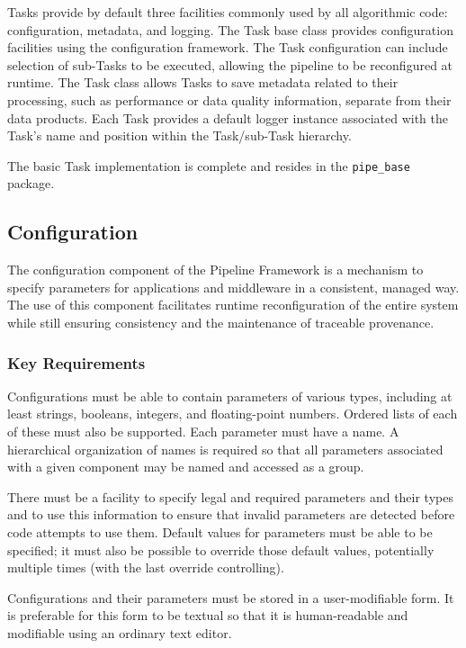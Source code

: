 \documentclass[DM,toc]{lsstdoc}
\begin{document}
Tasks provide by default three facilities commonly used by all algorithmic
code: configuration, metadata, and logging.  The Task base class provides
configuration facilities using the configuration framework. The Task
configuration can include selection of sub-Tasks to be executed, allowing the
pipeline to be reconfigured at runtime.  The Task class allows Tasks to save
metadata related to their processing, such as performance or data quality
information, separate from their data products.  Each Task provides a default
logger instance associated with the Task's name and position within the
Task/sub-Task hierarchy.

The basic Task implementation is complete and resides in the
\texttt{pipe\_base} package.

\subsection{Configuration}\label{configuration}

The configuration component of the Pipeline Framework is a mechanism to
specify parameters for applications and middleware in a consistent,
managed way. The use of this component facilitates runtime
reconfiguration of the entire system while still ensuring consistency
and the maintenance of traceable provenance.

\subsubsection{Key Requirements}\label{configuration-reqs}

Configurations must be able to contain parameters of various types,
including at least strings, booleans, integers, and floating-point
numbers. Ordered lists of each of these must also be supported. Each
parameter must have a name. A hierarchical organization of names is
required so that all parameters associated with a given component may be
named and accessed as a group.

There must be a facility to specify legal and required parameters and
their types and to use this information to ensure that invalid
parameters are detected before code attempts to use them. Default values
for parameters must be able to be specified; it must also be possible to
override those default values, potentially multiple times (with the last
override controlling).

Configurations and their parameters must be stored in a user-modifiable
form. It is preferable for this form to be textual so that it is
human-readable and modifiable using an ordinary text editor.
\end{document}
